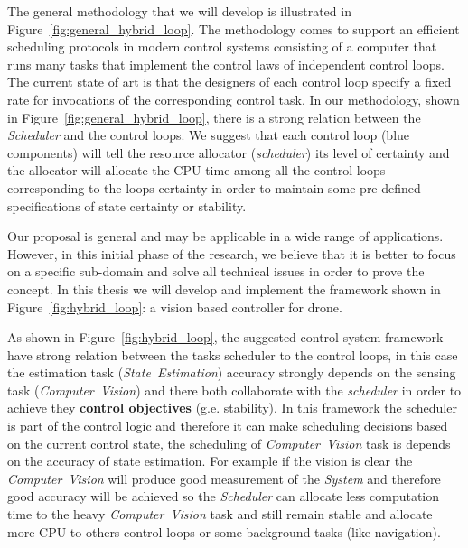 \documentclass[11pt]{article}
\begin{document}
The general methodology that we will develop is illustrated in Figure~\ref{fig:general_hybrid_loop}.
The methodology comes to support an efficient scheduling protocols in modern control systems consisting of a computer that runs many tasks that implement the control laws of independent control loops. 
The current state of art is that the designers of each control loop specify a fixed rate for invocations of the corresponding control task.
In our methodology, shown in Figure~\ref{fig:general_hybrid_loop}, there is a strong relation between the \textit{Scheduler} and the control loops. We suggest that each control loop (blue components) will tell the resource allocator (\textit{scheduler}) its level of certainty and the allocator will allocate the CPU time among all the control loops corresponding to the loops certainty in order to maintain some pre-defined specifications of state certainty or stability.

Our proposal is general and may be applicable in a wide range of applications. However, in this initial phase of the research, we believe that it is better to focus on a specific sub-domain and solve all technical issues in order to prove the concept.
In this thesis we will develop and implement the framework shown in Figure~\ref{fig:hybrid_loop}: a vision based controller for drone. 

As shown in Figure~\ref{fig:hybrid_loop}, the suggested control system framework have strong relation between the tasks scheduler to the control loops, in this case the estimation task (\textit{State~Estimation}) accuracy strongly depends on the sensing task (\textit{Computer~Vision}) and there both collaborate with the \textit{scheduler} in order to achieve they \textbf{control objectives} (g.e. stability).
In this framework the scheduler is part of the control logic and therefore it can make scheduling decisions based on the current control state, the scheduling of \textit{Computer~Vision} task is depends on the accuracy of state estimation.
For example if the vision is clear the \textit{Computer~Vision} will produce good measurement of the \textit{System} and therefore good accuracy will be achieved so the \textit{Scheduler} can allocate less computation time to the heavy \textit{Computer~Vision} task and still remain stable and allocate more CPU to others control loops or some background tasks (like navigation).
\end{document}
